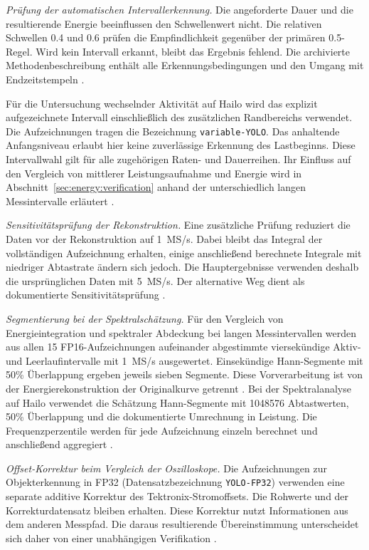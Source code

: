 \emph{Prüfung der automatischen Intervallerkennung.} Die angeforderte Dauer und die resultierende Energie beeinflussen den Schwellenwert nicht. Die relativen Schwellen \num{0.4} und \num{0.6} prüfen die Empfindlichkeit gegenüber der primären \num{0.5}-Regel. Wird kein Intervall erkannt, bleibt das Ergebnis fehlend. Die archivierte Methodenbeschreibung enthält alle Erkennungsbedingungen und den Umgang mit Endzeitstempeln \cite{energyEvidence2026}.

Für die Untersuchung wechselnder Aktivität auf Hailo wird das explizit aufgezeichnete Intervall einschließlich des zusätzlichen Randbereichs verwendet. Die Aufzeichnungen tragen die Bezeichnung \texttt{variable-YOLO}. Das anhaltende Anfangsniveau erlaubt hier keine zuverlässige Erkennung des Lastbeginns. Diese Intervallwahl gilt für alle zugehörigen Raten- und Dauerreihen. Ihr Einfluss auf den Vergleich von mittlerer Leistungsaufnahme und Energie wird in Abschnitt~\ref{sec:energy:verification} anhand der unterschiedlich langen Messintervalle erläutert \cite{mika2026timEnergy,energyEvidence2026}.

\emph{Sensitivitätsprüfung der Rekonstruktion.} Eine zusätzliche Prüfung reduziert die Daten vor der Rekonstruktion auf 1~MS/s. Dabei bleibt das Integral der vollständigen Aufzeichnung erhalten, einige anschließend berechnete Integrale mit niedriger Abtastrate ändern sich jedoch. Die Hauptergebnisse verwenden deshalb die ursprünglichen Daten mit 5~MS/s. Der alternative Weg dient als dokumentierte Sensitivitätsprüfung \cite{energyEvidence2026}.

\emph{Segmentierung bei der Spektralschätzung.} Für den Vergleich von Energieintegration und spektraler Abdeckung bei langen Messintervallen werden aus allen 15 FP16-Aufzeichnungen aufeinander abgestimmte viersekündige Aktiv- und Leerlaufintervalle mit 1~MS/s ausgewertet. Einsekündige Hann-Segmente mit 50\% Überlappung ergeben jeweils sieben Segmente. Diese Vorverarbeitung ist von der Energierekonstruktion der Originalkurve getrennt \cite{mika2026timEnergy,energyEvidence2026}. Bei der Spektralanalyse auf Hailo verwendet die Schätzung Hann-Segmente mit \num{1048576} Abtastwerten, 50\% Überlappung und die dokumentierte Umrechnung in Leistung. Die Frequenzperzentile werden für jede Aufzeichnung einzeln berechnet und anschließend aggregiert \cite{mika2026timEnergy}.

\emph{Offset-Korrektur beim Vergleich der Oszilloskope.} Die Aufzeichnungen zur Objekterkennung in FP32 (Datensatzbezeichnung \texttt{YOLO-FP32}) verwenden eine separate additive Korrektur des Tektronix-Stromoffsets. Die Rohwerte und der Korrekturdatensatz bleiben erhalten. Diese Korrektur nutzt Informationen aus dem anderen Messpfad. Die daraus resultierende Übereinstimmung unterscheidet sich daher von einer unabhängigen Verifikation \cite{energyEvidence2026}.

